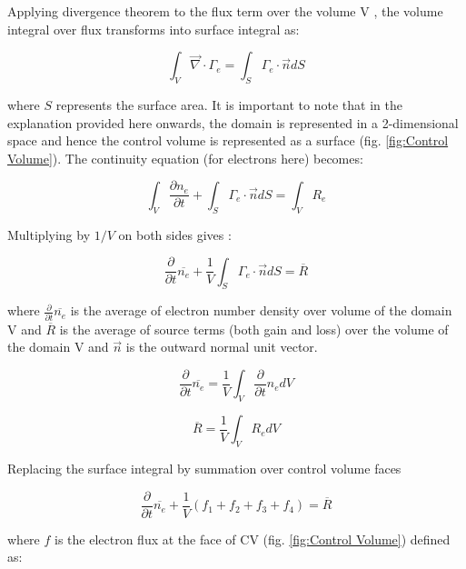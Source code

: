 \documentclass[paper=a4, fontsize=13pt]{scrartcl}
\begin{document}
Applying divergence theorem to the flux term over the volume V , the volume integral over flux transforms into surface integral as:

\begin{equation}
 \int_{V} \vec{\nabla} \cdot \Gamma_e = \int_{S}\Gamma_e \cdot \vec{n} dS
\end{equation}

where $S$ represents the surface area. It is important to note that in the explanation provided here onwards, the domain is represented in a 2-dimensional space and hence the control volume is represented as a surface (fig. \ref{fig:Control Volume}). The continuity equation (for electrons here) becomes:

\begin{equation}
\int_{V}\frac{\partial n_e}{\partial t} + \int_{S}\Gamma_e \cdot \vec{n} dS = \int_{V} R_e
\end{equation}

Multiplying by $1/V$ on both sides gives :

\begin{equation}
\frac{\partial }{\partial t} \overline{n_e} + \frac{1}{V}\int_{S}\Gamma_e \cdot \vec{n} dS = \overline{R}
\end{equation}

where $\frac{\partial }{\partial t} \overline{n_e}$ is the average of electron number density over volume of the domain V and $\overline{R}$ is the average of source terms (both gain and loss) over the volume of the domain V and $\vec{n}$ is the outward normal unit vector.

\begin{equation}
\frac{\partial }{\partial t} \overline{n_e} = \frac{1}{V} \int_{V} \frac{\partial }{\partial t} {n_e} dV
\end{equation}

\begin{equation}
\overline{R} = \frac{1}{V} \int_{V} R_e dV
\end{equation}

Replacing the surface integral by summation over control volume faces

\begin{equation} \label{eq:CV}
\frac{\partial }{\partial t} \overline{n_e} + \frac{1}{V}(f_1 + f_2 + f_3 + f_4) = \overline{R}
\end{equation}

where $f$ is the electron flux at the face of CV (fig. \ref{fig:Control Volume}) defined as:
\end{document}
